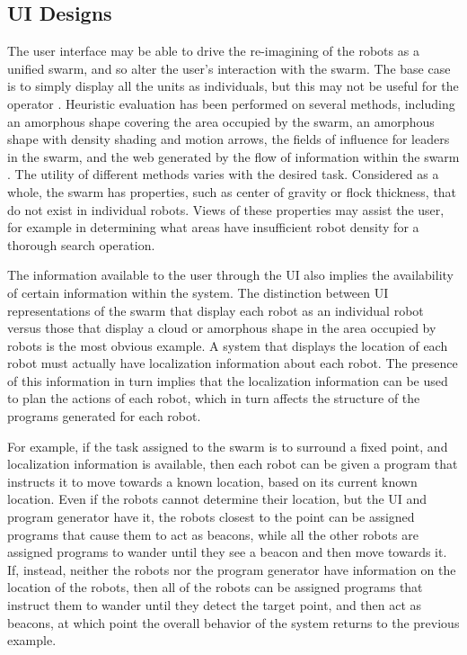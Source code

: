 \subsection{UI Designs}

The user interface may be able to drive the re-imagining of the robots as a unified swarm, and so alter the user's interaction with the swarm. 
The base case is to simply display all the units as individuals, but this may not be useful for the operator \citep{coppin2012controlling}. 
Heuristic evaluation has been performed on several methods, including an amorphous shape covering the area occupied by the swarm, an amorphous shape with density shading and motion arrows, the fields of influence for leaders in the swarm, and the web generated by the flow of information within the swarm \citep{manning2015heuristic}.
The utility of different methods varies with the desired task.
Considered as a whole, the swarm has properties, such as center of gravity or flock thickness, that do not exist in individual robots. 
Views of these properties may assist the user, for example in determining what areas have insufficient robot density for a thorough search operation. 

The information available to the user through the UI also implies the availability of certain information within the system. 
The distinction between UI representations of the swarm that display each robot as an individual robot versus those that display a cloud or amorphous shape in the area occupied by robots is the most obvious example. 
A system that displays the location of each robot must actually have localization information about each robot.
The presence of this information in turn implies that the localization information can be used to plan the actions of each robot, which in turn affects the structure of the programs generated for each robot. 

For example, if the task assigned to the swarm is to surround a fixed point, and localization information is available, then each robot can be given a program that instructs it to move towards a known location, based on its current known location.
Even if the robots cannot determine their location, but the UI and program generator have it, the robots closest to the point can be assigned programs that cause them to act as beacons, while all the other robots are assigned programs to wander until they see a beacon and then move towards it. 
If, instead, neither the robots nor the program generator have information on the location of the robots, then all of the robots can be assigned programs that instruct them to wander until they detect the target point, and then act as beacons, at which point the overall behavior of the system returns to the previous example.

